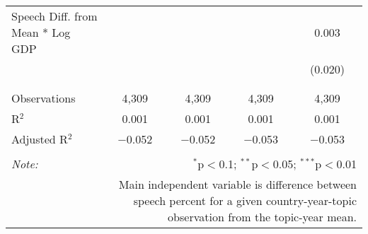 \begin{table}[!htbp]
\begin{tabular}{@{\extracolsep{5pt}}lcccc}
 Speech Diff. from Mean * Log GDP &  &  &  & 0.003 \\ 
  &  &  &  & (0.020) \\ 
  & & & & \\ 
\hline \\[-1.8ex] 
Observations & 4,309 & 4,309 & 4,309 & 4,309 \\ 
R$^{2}$ & 0.001 & 0.001 & 0.001 & 0.001 \\ 
Adjusted R$^{2}$ & $-$0.052 & $-$0.052 & $-$0.053 & $-$0.053 \\ 
\hline 
\hline \\[-1.8ex] 
\textit{Note:}  & \multicolumn{4}{r}{$^{*}$p$<$0.1; $^{**}$p$<$0.05; $^{***}$p$<$0.01} \\ 
 & \multicolumn{4}{r}{Main independent variable is difference between speech percent for a given country-year-topic observation from the topic-year mean.} \\ 
\end{tabular} 
\end{table} 
